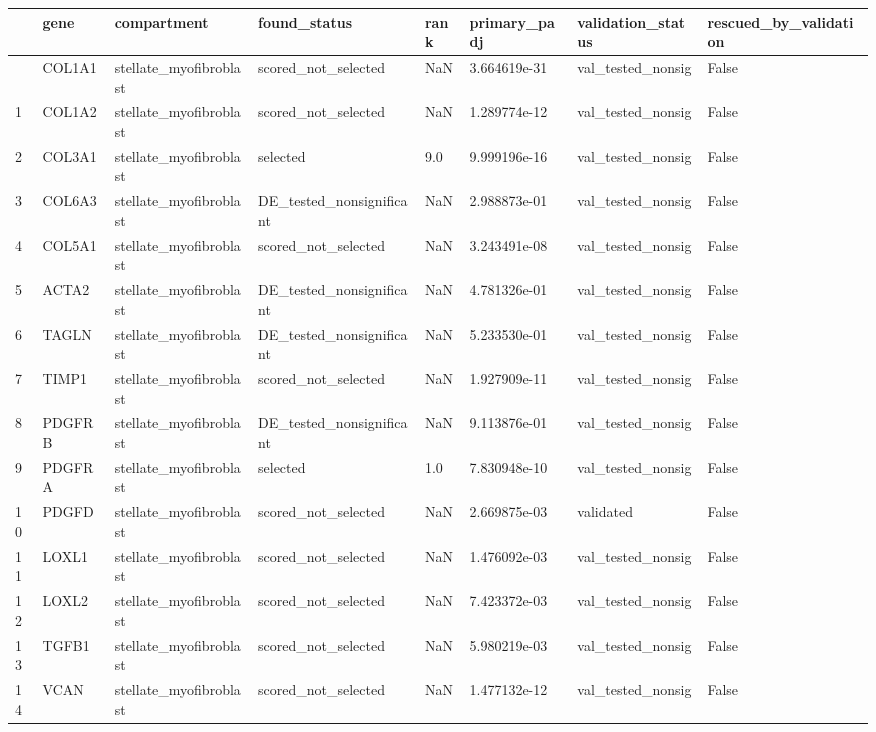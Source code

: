 \documentclass[
  letterpaper,
  DIV=11,
  numbers=noendperiod]{scrartcl}
\newcounter{none} %
\begin{document}
{\def\LTcaptype{none} %
\begin{longtable}[]{@{}llllllll@{}}
\toprule\noalign{}
& gene & compartment & found\_status & rank & primary\_padj &
validation\_status & rescued\_by\_validation \\
\midrule\noalign{}
\endhead
\bottomrule\noalign{}
\endlastfoot
0 & COL1A1 & stellate\_myofibroblast & scored\_not\_selected & NaN &
3.664619e-31 & val\_tested\_nonsig & False \\
1 & COL1A2 & stellate\_myofibroblast & scored\_not\_selected & NaN &
1.289774e-12 & val\_tested\_nonsig & False \\
2 & COL3A1 & stellate\_myofibroblast & selected & 9.0 & 9.999196e-16 &
val\_tested\_nonsig & False \\
3 & COL6A3 & stellate\_myofibroblast & DE\_tested\_nonsignificant & NaN
& 2.988873e-01 & val\_tested\_nonsig & False \\
4 & COL5A1 & stellate\_myofibroblast & scored\_not\_selected & NaN &
3.243491e-08 & val\_tested\_nonsig & False \\
5 & ACTA2 & stellate\_myofibroblast & DE\_tested\_nonsignificant & NaN &
4.781326e-01 & val\_tested\_nonsig & False \\
6 & TAGLN & stellate\_myofibroblast & DE\_tested\_nonsignificant & NaN &
5.233530e-01 & val\_tested\_nonsig & False \\
7 & TIMP1 & stellate\_myofibroblast & scored\_not\_selected & NaN &
1.927909e-11 & val\_tested\_nonsig & False \\
8 & PDGFRB & stellate\_myofibroblast & DE\_tested\_nonsignificant & NaN
& 9.113876e-01 & val\_tested\_nonsig & False \\
9 & PDGFRA & stellate\_myofibroblast & selected & 1.0 & 7.830948e-10 &
val\_tested\_nonsig & False \\
10 & PDGFD & stellate\_myofibroblast & scored\_not\_selected & NaN &
2.669875e-03 & validated & False \\
11 & LOXL1 & stellate\_myofibroblast & scored\_not\_selected & NaN &
1.476092e-03 & val\_tested\_nonsig & False \\
12 & LOXL2 & stellate\_myofibroblast & scored\_not\_selected & NaN &
7.423372e-03 & val\_tested\_nonsig & False \\
13 & TGFB1 & stellate\_myofibroblast & scored\_not\_selected & NaN &
5.980219e-03 & val\_tested\_nonsig & False \\
14 & VCAN & stellate\_myofibroblast & scored\_not\_selected & NaN &
1.477132e-12 & val\_tested\_nonsig & False \\

\end{longtable}}
\end{document}
